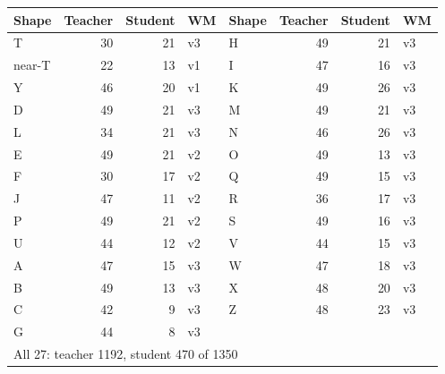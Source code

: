 
\begin{tabular}{lrrl@{\hspace{1.5em}}lrrl}
\toprule
Shape & Teacher & Student & WM & Shape & Teacher & Student & WM \\
\midrule
T & 30 & 21 & v3 & H & 49 & 21 & v3 \\
near-T & 22 & 13 & v1 & I & 47 & 16 & v3 \\
Y & 46 & 20 & v1 & K & 49 & 26 & v3 \\
D & 49 & 21 & v3 & M & 49 & 21 & v3 \\
L & 34 & 21 & v3 & N & 46 & 26 & v3 \\
E & 49 & 21 & v2 & O & 49 & 13 & v3 \\
F & 30 & 17 & v2 & Q & 49 & 15 & v3 \\
J & 47 & 11 & v2 & R & 36 & 17 & v3 \\
P & 49 & 21 & v2 & S & 49 & 16 & v3 \\
U & 44 & 12 & v2 & V & 44 & 15 & v3 \\
A & 47 & 15 & v3 & W & 47 & 18 & v3 \\
B & 49 & 13 & v3 & X & 48 & 20 & v3 \\
C & 42 & 9 & v3 & Z & 48 & 23 & v3 \\
G & 44 & 8 & v3 &  & & &  \\
\midrule
\multicolumn{8}{l}{All 27: teacher 1192, student 470 of 1350} \\
\bottomrule
\end{tabular}
